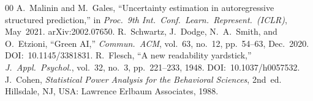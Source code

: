 \documentclass[conference]{IEEEtran}
\begin{document}
\begin{thebibliography}{00}
A.~Malinin and M.~Gales,
``Uncertainty estimation in autoregressive structured
prediction,''
in \textit{Proc.\ 9th Int.\ Conf.\ Learn.\ Represent.\ (ICLR)},
May~2021.
arXiv:2002.07650.
R.~Schwartz, J.~Dodge, N.~A.~Smith, and O.~Etzioni,
``Green AI,''
\textit{Commun.\ ACM}, vol.~63, no.~12, pp.~54--63, Dec.~2020.
DOI:~10.1145/3381831.
R.~Flesch,
``A new readability yardstick,''
\textit{J.~Appl.\ Psychol.}, vol.~32, no.~3, pp.~221--233,
1948.
DOI:~10.1037/h0057532.
J.~Cohen,
\textit{Statistical Power Analysis for the Behavioral Sciences},
2nd~ed. Hillsdale, NJ, USA: Lawrence Erlbaum Associates, 1988.
\end{thebibliography}
\end{document}
